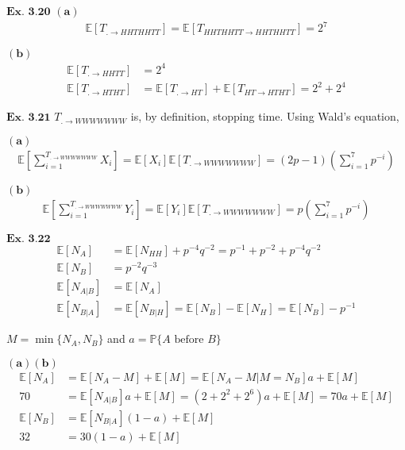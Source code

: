 \documentclass{article}
\begin{document}
\vspace{0.2in}
${\textbf{Ex. 3.20}}$
$\mathbf{(a)}$
\begin{align*}
\mathbb{E}[T_{.\rightarrow HHTHHTT}] = \mathbb{E}[T_{HHTHHTT\rightarrow HHTHHTT}] = 2^7
\end{align*}

$\mathbf{(b)}$
\begin{align*}
\mathbb{E}[T_{.\rightarrow HHTT}] &= 2^4\\
\mathbb{E}[T_{.\rightarrow HTHT}] &= \mathbb{E}[T_{.\rightarrow HT}] + \mathbb{E}[T_{HT\rightarrow HTHT}] = 2^2 + 2^4
\end{align*}

\vspace{0.2in}
${\textbf{Ex. 3.21}}$
$T_{.\rightarrow WWWWWWW}$ is, by definition, stopping time. Using Wald's equation,

$\mathbf{(a)}$
\begin{align*}
\mathbb{E}\left[\sum_{i=1}^{T_{.\rightarrow WWWWWWW}}X_i\right] = \mathbb{E}[X_i]\mathbb{E}[T_{.\rightarrow WWWWWWW}] = (2p-1)(\sum_{i=1}^{7}p^{-i})
\end{align*}

$\mathbf{(b)}$
\begin{align*}
\mathbb{E}\left[\sum_{i=1}^{T_{.\rightarrow WWWWWWW}}Y_i\right] = \mathbb{E}[Y_i]\mathbb{E}[T_{.\rightarrow WWWWWWW}] = p(\sum_{i=1}^{7}p^{-i})
\end{align*}

\vspace{0.2in}
${\textbf{Ex. 3.22}}$
\begin{align*}
\mathbb{E}[N_{A}] &= \mathbb{E}[N_{HH}] + p^{-4}q^{-2} = p^{-1} + p^{-2} + p^{-4}q^{-2}\\
\mathbb{E}[N_{B}] &= p^{-2}q^{-3}\\
\mathbb{E}[N_{A|B}] &= \mathbb{E}[N_{A}]\\
\mathbb{E}[N_{B|A}] &= \mathbb{E}[N_{B|H}] = \mathbb{E}[N_{B}] - \mathbb{E}[N_{H}] = \mathbb{E}[N_{B}] - p^{-1}
\end{align*}

$M = \min\{N_A,N_B\}$ and $a = \mathbb{P}\{A \text{ before } B\}$

$\mathbf{(a)(b)}$
\begin{align*}
\mathbb{E}[N_{A}] &= \mathbb{E}[N_A-M] + \mathbb{E}[M] = \mathbb{E}[N_{A}-M|M=N_{B}]a + \mathbb{E}[M]\\
70 &= \mathbb{E}[N_{A|B}]a + \mathbb{E}[M] = (2+2^2+2^6)a+\mathbb{E}[M] = 70a+\mathbb{E}[M]\\
\mathbb{E}[N_B] &= \mathbb{E}[N_{B|A}](1-a) + \mathbb{E}[M]\\
32 &= 30(1-a) + \mathbb{E}[M]
\end{align*}
\end{document}
